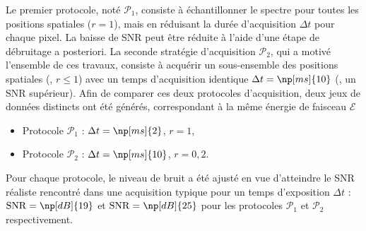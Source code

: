 Le premier protocole, noté $\mathcal{P}_1$, consiste à échantillonner le spectre pour toutes les positions spatiales ($r=1$), mais en réduisant la durée d'acquisition $\Delta t$ pour chaque pixel. La baisse de SNR peut être réduite à l'aide d'une étape de débruitage a posteriori.
%
La seconde stratégie d'acquisition $\mathcal{P}_2$, qui a motivé l'ensemble de ces travaux, consiste à acquérir un sous-ensemble des positions spatiales (\ie{}, $r\leq 1$) avec un temps d'acquisition identique $\Delta t= \np[ms]{10}$ (\ie{}, un SNR supérieur). 
%
Afin de comparer ces deux protocoles d'acquisition, deux jeux de données distincts ont été générés, correspondant à la même énergie de faisceau $\mathcal{E}$
\begin{itemize}
    \item Protocole $\mathcal{P}_1$ : $\Delta t=\np[ms]{2}$, $r=1$,
    \item Protocole $\mathcal{P}_2$ : $\Delta t=\np[ms]{10}$, $r=0,2$.
\end{itemize}
Pour chaque protocole, le niveau de bruit a été ajusté en vue d'atteindre le SNR réaliste rencontré dans une acquisition typique pour un temps d'exposition $\Delta t$ : $\mathrm{SNR} = \np[dB]{19}$ et $\mathrm{SNR} = \np[dB]{25}$ pour les protocoles $\mathcal{P}_1$ et $\mathcal{P}_2$ respectivement.

